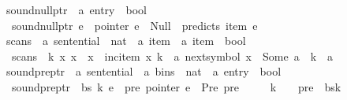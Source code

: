 \begin{isabellebody}
\isanewline
{}\isamarkupfalse%
\ sound{\isacharunderscore}{\kern0pt}null{\isacharunderscore}{\kern0pt}ptr\ {\isacharcolon}{\kern0pt}{\isacharcolon}{\kern0pt}\ {\isachardoublequoteopen}{\isacharprime}{\kern0pt}a\ entry\ {\isasymRightarrow}\ bool{\isachardoublequoteclose}\ \isanewline
\ \ {\isachardoublequoteopen}sound{\isacharunderscore}{\kern0pt}null{\isacharunderscore}{\kern0pt}ptr\ e\ {\isasymequiv}\ pointer\ e\ {\isacharequal}{\kern0pt}\ Null\ {\isasymlongrightarrow}\ predicts\ {\isacharparenleft}{\kern0pt}item\ e{\isacharparenright}{\kern0pt}{\isachardoublequoteclose}\isanewline
\isanewline
{}\isamarkupfalse%
\ scans\ {\isacharcolon}{\kern0pt}{\isacharcolon}{\kern0pt}\ {\isachardoublequoteopen}{\isacharprime}{\kern0pt}a\ sentential\ {\isasymRightarrow}\ nat\ {\isasymRightarrow}\ {\isacharprime}{\kern0pt}a\ item\ {\isasymRightarrow}\ {\isacharprime}{\kern0pt}a\ item\ {\isasymRightarrow}\ bool{\isachardoublequoteclose}\ \isanewline
\ \ {\isachardoublequoteopen}scans\ {\isasymomega}\ k\ x{\isacharprime}{\kern0pt}\ x\ {\isasymequiv}\ x\ {\isacharequal}{\kern0pt}\ inc{\isacharunderscore}{\kern0pt}item\ x{\isacharprime}{\kern0pt}\ k\ {\isasymand}\ {\isacharparenleft}{\kern0pt}{\isasymexists}a{\isachardot}{\kern0pt}\ next{\isacharunderscore}{\kern0pt}symbol\ x{\isacharprime}{\kern0pt}\ {\isacharequal}{\kern0pt}\ Some\ a\ {\isasymand}\ {\isasymomega}{\isacharbang}{\kern0pt}{\isacharparenleft}{\kern0pt}k{\isacharminus}{\kern0pt}{}{\isacharparenright}{\kern0pt}\ {\isacharequal}{\kern0pt}\ a{\isacharparenright}{\kern0pt}{\isachardoublequoteclose}\isanewline
\isanewline
{}\isamarkupfalse%
\ sound{\isacharunderscore}{\kern0pt}pre{\isacharunderscore}{\kern0pt}ptr\ {\isacharcolon}{\kern0pt}{\isacharcolon}{\kern0pt}\ {\isachardoublequoteopen}{\isacharprime}{\kern0pt}a\ sentential\ {\isasymRightarrow}\ {\isacharprime}{\kern0pt}a\ bins\ {\isasymRightarrow}\ nat\ {\isasymRightarrow}\ {\isacharprime}{\kern0pt}a\ entry\ {\isasymRightarrow}\ bool{\isachardoublequoteclose}\ \isanewline
\ \ {\isachardoublequoteopen}sound{\isacharunderscore}{\kern0pt}pre{\isacharunderscore}{\kern0pt}ptr\ {\isasymomega}\ bs\ k\ e\ {\isasymequiv}\ {\isasymforall}pre{\isachardot}{\kern0pt}\ pointer\ e\ {\isacharequal}{\kern0pt}\ Pre\ pre\ {\isasymlongrightarrow}\isanewline
\ \ \ \ k\ {\isachargreater}{\kern0pt}\ {}\ {\isasymand}\ pre\ {\isacharless}{\kern0pt}\ {\isacharbar}{\kern0pt}bs{\isacharbang}{\kern0pt}{\isacharparenleft}{\kern0pt}k{\isacharminus}{\kern0pt}{}{\isacharparenright}{\kern0pt}{\isacharbar}{\kern0pt}\ {\isasymand}\isanewline

\end{isabellebody}
